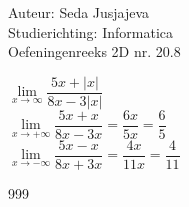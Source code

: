 \documentclass[a4paper]{article}
\begin{document}
\noindent \large Auteur: Seda Jusjajeva\\
\noindent \large Studierichting: Informatica\\
\noindent \large Oefeningenreeks 2D nr. 20.8 \\

\medskip

\normalsize


$\lim\limits_{x \to \infty} \dfrac{5x + |x|}{8x - 3|x|}$ \\
    
$\lim\limits_{x \to +\infty} \dfrac{5x + x}{8x - 3x} = \dfrac{6x}{5x} = \dfrac{6}{5}$ \\
    
$\lim\limits_{x \to -\infty} \dfrac{5x - x}{8x + 3x} = \dfrac{4x}{11x} = \dfrac{4}{11}$ \\



\begin{thebibliography}{999}
\end{thebibliography}
\end{document}
